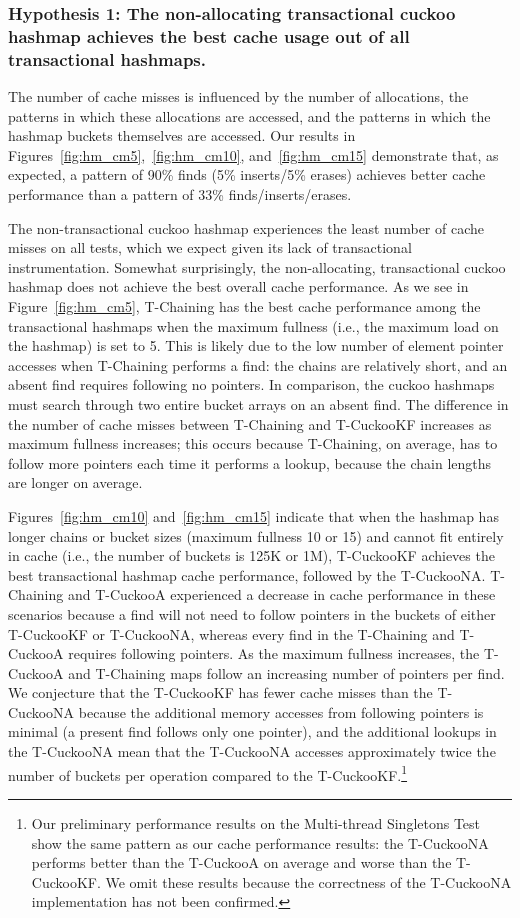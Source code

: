 \subsubsection{Hypothesis 1: The non-allocating transactional cuckoo hashmap achieves the best cache usage out of all transactional hashmaps.}
\label{section:hmcm}

The number of cache misses is influenced by the number of allocations, the patterns in which these allocations are accessed, and the patterns in which the hashmap buckets themselves are accessed. Our results in Figures~\ref{fig:hm_cm5},~\ref{fig:hm_cm10}, and~\ref{fig:hm_cm15} demonstrate that, as expected, a pattern of 90\% finds (5\% inserts/5\% erases) achieves better cache performance than a pattern of 33\% finds/inserts/erases.

The non-transactional cuckoo hashmap experiences the least number of cache misses on all tests, which we expect given its lack of transactional instrumentation. Somewhat surprisingly, the non-allocating, transactional cuckoo hashmap does not achieve the best overall cache performance. 
As we see in Figure~\ref{fig:hm_cm5}, T-Chaining has the best cache performance among the transactional hashmaps when the maximum fullness (i.e., the maximum load on the hashmap) is set to 5. This is likely due to the low number of element pointer accesses when T-Chaining performs a find: the chains are relatively short, and an absent find requires following no pointers. In comparison, the cuckoo hashmaps must search through two entire bucket arrays on an absent find. The difference in the number of cache misses between T-Chaining and T-CuckooKF increases as maximum fullness increases; this occurs because T-Chaining, on average, has to follow more pointers each time it performs a lookup, because the chain lengths are longer on average.

Figures~\ref{fig:hm_cm10} and~\ref{fig:hm_cm15} indicate that when the hashmap has longer chains or bucket sizes (maximum fullness 10 or 15) and cannot fit entirely in cache (i.e., the number of buckets is 125K or 1M), T-CuckooKF achieves the best transactional hashmap cache performance, followed by the T-CuckooNA. 
T-Chaining and T-CuckooA experienced a decrease in cache performance in these scenarios because a find will not need to follow pointers in the buckets of either T-CuckooKF or T-CuckooNA, whereas every find in the T-Chaining and T-CuckooA requires following pointers. As the maximum fullness increases, the T-CuckooA and T-Chaining maps follow an increasing number of pointers per find.
We conjecture that the T-CuckooKF has fewer cache misses than the T-CuckooNA because the additional memory accesses from following pointers is minimal (a present find follows only one pointer), and the additional lookups in the T-CuckooNA mean that the T-CuckooNA accesses approximately twice the number of buckets per operation compared to the T-CuckooKF.\footnote{Our preliminary performance results on the Multi-thread Singletons Test show the same pattern as our cache performance results: the T-CuckooNA performs better than the T-CuckooA on average and worse than the T-CuckooKF. We omit these results because the correctness of the T-CuckooNA implementation has not been confirmed.}

